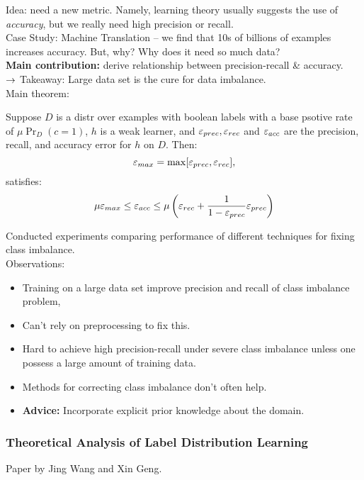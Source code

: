 Idea: need a new metric. Namely, learning theory usually suggests the use of {\it accuracy}, but we really need high precision or recall. \\

Case Study: Machine Translation -- we find that 10s of billions of examples increases accuracy. But, why? Why does it need so much data? \\

{\bf Main contribution:} derive relationship between precision-recall \& accuracy. \\

$\rightarrow$ Takeaway: Large data set is the cure for data imbalance. \\

Main theorem:
\begin{theorem}
Suppose $D$ is a distr over examples with boolean labels with a base psotive rate of $\mu \Pr_D(c = 1)$, $h$ is a weak learner, and $\varepsilon_{prec}, \varepsilon_{rec}$ and $\varepsilon_{acc}$ are the precision, recall, and accuracy error for $h$ on $D$. Then:
\[
\varepsilon_{max} = \max[\varepsilon_{prec},\varepsilon_{rec}],
\]
satisfies:
\[
\mu \varepsilon_{max} \leq \varepsilon_{acc} \leq \mu\left(\varepsilon_{rec} + \frac{1}{1 - \varepsilon_{prec}} \varepsilon_{prec}\right)
\]
\end{theorem}

Conducted experiments comparing performance of different techniques for fixing class imbalance. \\
Observations:
\begin{itemize}
    \item Training on  a large data set improve precision and recall of class imbalance problem,
    \item Can't rely on preprocessing to fix this.
    \item Hard to achieve high precision-recall under severe class imbalance unless one possess a large amount of training data.
    \item Methods for correcting class imbalance don't often help.
    \item {\bf Advice:} Incorporate explicit prior knowledge about the domain.
\end{itemize}


\subsubsection{Theoretical Analysis of Label Distribution Learning}

Paper by Jing Wang and Xin Geng. \\

